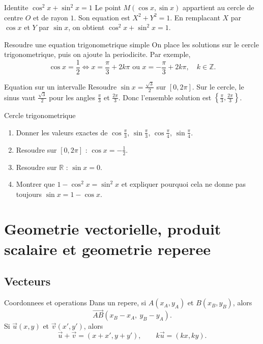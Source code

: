 \documentclass[11pt,a4paper]{article}
\newcommand{\R}{\mathbb{R}}
\newcommand{\vect}[1]{\overrightarrow{#1}}
\begin{document}
\begin{boitepreuve}{Identite $\cos^2x+\sin^2x=1$}
Le point $M(\cos x,\sin x)$ appartient au cercle de centre $O$ et de rayon $1$. Son equation est $X^2+Y^2=1$. En remplacant $X$ par $\cos x$ et $Y$ par $\sin x$, on obtient $\cos^2x+\sin^2x=1$.
\end{boitepreuve}

\begin{boitemethode}{Resoudre une equation trigonometrique simple}
On place les solutions sur le cercle trigonometrique, puis on ajoute la periodicite. Par exemple,
\[
\cos x=\frac12 \Longleftrightarrow x=\frac\pi3+2k\pi \text{ ou }x=-\frac\pi3+2k\pi,
\quad k\in\mathbb Z.
\]
\end{boitemethode}

\begin{boiteexemple}{Equation sur un intervalle}
Resoudre $\sin x=\frac{\sqrt3}{2}$ sur $[0,2\pi]$. Sur le cercle, le sinus vaut $\frac{\sqrt3}{2}$ pour les angles $\frac\pi3$ et $\frac{2\pi}3$. Donc l'ensemble solution est $\left\{\frac\pi3,\frac{2\pi}3\right\}$.
\end{boiteexemple}

\begin{exobox}{Cercle trigonometrique}
\begin{enumerate}
  \item Donner les valeurs exactes de $\cos\frac\pi3$, $\sin\frac\pi3$, $\cos\frac\pi4$, $\sin\frac\pi4$.
  \item Resoudre sur $[0,2\pi]$ : $\cos x=-\frac12$.
  \item Resoudre sur $\R$ : $\sin x=0$.
  \item Montrer que $1-\cos^2x=\sin^2x$ et expliquer pourquoi cela ne donne pas toujours $\sin x=1-\cos x$.
\end{enumerate}
\end{exobox}


\section{Geometrie vectorielle, produit scalaire et geometrie reperee}

\subsection{Vecteurs}
\begin{boitecours}{Coordonnees et operations}
Dans un repere, si $A(x_A,y_A)$ et $B(x_B,y_B)$, alors
\[
\vect{AB}(x_B-x_A,\ y_B-y_A).
\]
Si $\vec u(x,y)$ et $\vec v(x',y')$, alors
\[
\vec u+\vec v=(x+x',y+y'),\qquad k\vec u=(kx,ky).
\]
\end{boitecours}
\end{document}
